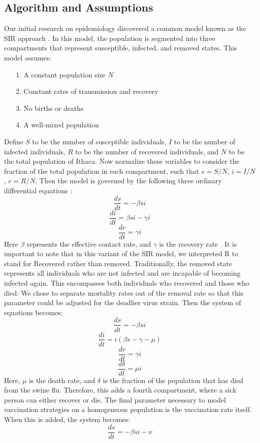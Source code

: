 \documentclass[titlepage]{article}
\begin{document}
\subsection{Algorithm and Assumptions}
	Our initial research on epidemiology discovered a common model known as the SIR approach \cite{SIR}. In this model, the population is segmented into three compartments that represent susceptible, infected, and removed states. This model assumes:
	\begin{itemize}
		\item[1.]
			A constant population size $N$
		\item[2.]
			Constant rates of transmission and recovery
		\item[3.]
			No births or deaths
		\item[4.]
			A well-mixed population
	\end{itemize}
	Define $S$ to be the number of susceptible individuals, $I$ to be the number of infected individuals, $R$ to be the number of recovered individuals, and $N$ to be the total population of Ithaca. Now normalize these variables  to consider the fraction of the total population in each compartment, such that $s = S/N$, $i = I/N$, $r = R/N$. Then the model is governed by the following three ordinary differential equations \cite{SIR}:
	\[
		\frac{ds}{dt} = - \beta s i
	\]
	\[
		\frac{di}{dt} = \beta s i - \gamma i
	\]
	\[
		\frac{dr}{dt} = \gamma i
	\]
	Here $\beta$ represents the effective contact rate, and $\gamma$ is the recovery rate \cite{SIR}. It is important to note that in this variant of the SIR model, we interpreted R to stand for Recovered rather than removed. Traditionally, the removed state represents all individuals who are not infected and are incapable of becoming infected again. This encompasses both individuals who recovered and those who died. We chose to separate mortality rates out of the removal rate so that this parameter could be adjusted for the deadlier virus strain. Then the system of equations becomes:
	\[
		\frac{ds}{dt} = - \beta s i
	\]
	\[
		\frac{di}{dt} =  i (\beta s -\gamma - \mu)
	\]
	\[
		\frac{dr}{dt} = \gamma i
	\]
	\[
		\frac{d\delta}{dt} = \mu i
	\]
	Here, $\mu$ is the death rate, and $\delta$ is the fraction of the population that has died from the swine flu. Therefore, this adds a fourth compartment, where a sick person can either recover or die. The final parameter necessary to model vaccination strategies on a homogeneous population is the vaccination rate itself. When this is added, the system becomes\cite{applet}:
	\[
		\frac{ds}{dt} = - \beta s i - \nu
	\]
\end{document}
